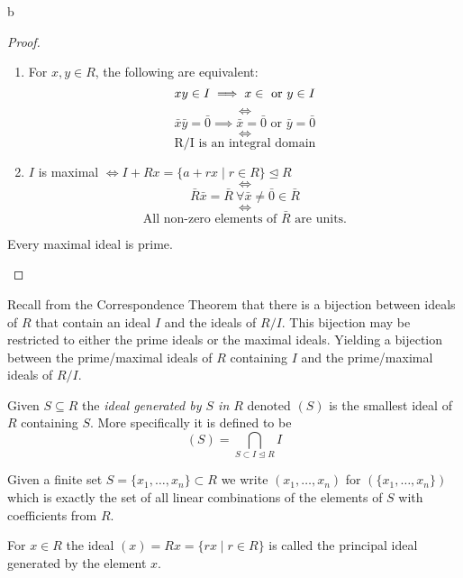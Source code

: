b\documentclass[master.tex]{subfiles}
\begin{document}
\begin{proof}
  \begin{enumerate}[label=(\alph*)]
  \item For \(x,y \in R\), the following are equivalent:
    \[xy \in I \implies x \in \text{ or } y \in I\\\] \[\iff\]
    \[\bar{x}\bar{y}=\bar{0} \implies \bar{x}=\bar{0} \text{ or } \bar{y}=\bar{0}\] \[\iff\] \[\text{R/I is an
        integral domain}\]
  \item \(I\) is maximal \(\iff I + Rx = \{a+rx \mid r \in R\} \unlhd R\)
    \[\iff\]
    \[\bar{R}\bar{x}=\bar{R} \ \forall \bar{x} \neq \bar{0} \in \bar{R}\]
    \[\iff\]
    \[\text{All non-zero elements of \(\bar{R}\) are units.}\]
  \end{enumerate}

  \begin{cor*}
    Every maximal ideal is prime.
  \end{cor*}
\end{proof}

\begin{rmk}
  Recall from the Correspondence Theorem that there is a bijection between ideals of \(R\) that contain an ideal \(I\)
  and the ideals of \(R/I\). This bijection may be restricted to either the prime ideals or the maximal ideals. Yielding
  a bijection between the prime/maximal ideals of \(R\) containing \(I\) and the prime/maximal ideals of \(R/I\).
\end{rmk}

\begin{defn*}
  Given \(S \subseteq R\) the \emph{ideal generated by \(S\) in \(R\)} denoted \((S)\) is the smallest ideal of \(R\)
  containing \(S\). More specifically it is defined to be
  \[(S)=\bigcap_{S \subset I \unlhd R} I\]
\end{defn*}

\begin{notation}
  Given a finite set \(S=\{x_1,\ldots,x_n\} \subset R\) we write \((x_1,\ldots,x_n)\) for
  \(\left(\{x_1,\ldots,x_n\}\right)\) which is exactly the set of all linear combinations of the elements of \(S\) with
  coefficients from \(R\).
\end{notation}

\begin{defn*}
  For \(x \in R\) the ideal \((x)=Rx=\{rx \mid r \in R\}\) is called the principal ideal generated by the element \(x\).
\end{defn*}
\end{document}
